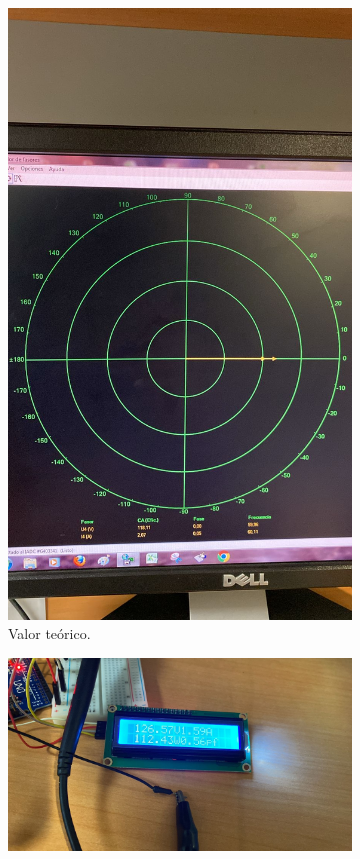 \begin{figure}[h]
    \centering
    \begin{subfigure}{0.45\textwidth}
        \includegraphics[width=\textwidth]{Imagenes/resistive.jpg}
        \caption{Valor teórico.}
    \end{subfigure}
    \begin{subfigure}{0.45\textwidth}
        \includegraphics[width=\textwidth]{Imagenes/resistive_2.jpg} 

\end{subfigure}
\end{figure}
